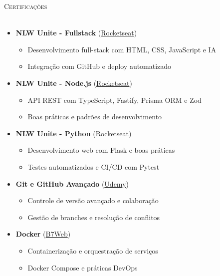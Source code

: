 \documentclass[a4paper]{article}
\newcommand{\lineunder}{
    \vspace*{-8pt} \\
    \hspace*{-18pt} \hrulefill \\
}
\newcommand{\header}[1]{
    {\hspace*{-18pt}\vspace*{6pt} \textsc{#1}}
    \vspace*{-6pt} \lineunder
}
\begin{document}
%
%
\header{Certificações}
\vspace{1mm}
\begin{itemize}[leftmargin=*] \itemsep -2pt
    \item \textbf{NLW Unite - Fullstack} (\href{https://app.rocketseat.com.br/certificates/d3577eb6-c50f-42f3-b595-b96297ef0e05}{Rocketseat})
    \begin{itemize} \itemsep -1pt
        \item Desenvolvimento full-stack com HTML, CSS, JavaScript e IA
        \item Integração com GitHub e deploy automatizado
    \end{itemize}
    
    \item \textbf{NLW Unite - Node.js} (\href{https://app.rocketseat.com.br/certificates/a53012ec-27a9-419e-9a8c-86f28508a406}{Rocketseat})
    \begin{itemize} \itemsep -1pt
        \item API REST com TypeScript, Fastify, Prisma ORM e Zod
        \item Boas práticas e padrões de desenvolvimento
    \end{itemize}
    
    \item \textbf{NLW Unite - Python} (\href{https://app.rocketseat.com.br/certificates/c5f21b9b-53c5-4ed7-bc45-430d87cccf77}{Rocketseat})
    \begin{itemize} \itemsep -1pt
        \item Desenvolvimento web com Flask e boas práticas
        \item Testes automatizados e CI/CD com Pytest
    \end{itemize}
    
    \item \textbf{Git e GitHub Avançado} (\href{https://www.udemy.com/certificate/UC-db57cce7-1471-47ff-9828-0e3a4d7da628/}{Udemy})
    \begin{itemize} \itemsep -1pt
        \item Controle de versão avançado e colaboração
        \item Gestão de branches e resolução de conflitos
    \end{itemize}
    
    \item \textbf{Docker} (\href{https://drive.google.com/drive/folders/1YKThgvnT5h1bA_Hb0uDiIf7p8Qiph-NC}{B7Web})
    \begin{itemize} \itemsep -1pt
        \item Containerização e orquestração de serviços
        \item Docker Compose e práticas DevOps
    \end{itemize}
    

\end{itemize}
\end{document}
